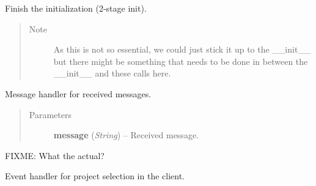 \documentclass[letterpaper,10pt,english]{sphinxmanual}
\begin{document}
\begin{fulllineitems}
\begin{fulllineitems}
\end{fulllineitems}


\begin{fulllineitems}
\label{state:state.State.initialize}
Finish the initialization (2-stage init).
\begin{quote}\begin{description}
\item[{Note }] \leavevmode
As this is not so essential, we could just stick it up to
the \_\_init\_\_ but there might be something that needs to be
done in between the \_\_init\_\_ and these calls here.

\end{description}\end{quote}

\end{fulllineitems}


\begin{fulllineitems}
\label{state:state.State.message_handler}
Message handler for received messages.
\begin{quote}\begin{description}
\item[{Parameters}] \leavevmode
\textbf{message} (\emph{String}) -- Received message.

\end{description}\end{quote}

\end{fulllineitems}


\begin{fulllineitems}
\label{state:state.State.node_id}
FIXME: What the actual?

\end{fulllineitems}


\begin{fulllineitems}
\label{state:state.State.on_project_selected}
Event handler for project selection in the client.


\end{fulllineitems}
\end{fulllineitems}
\end{document}
